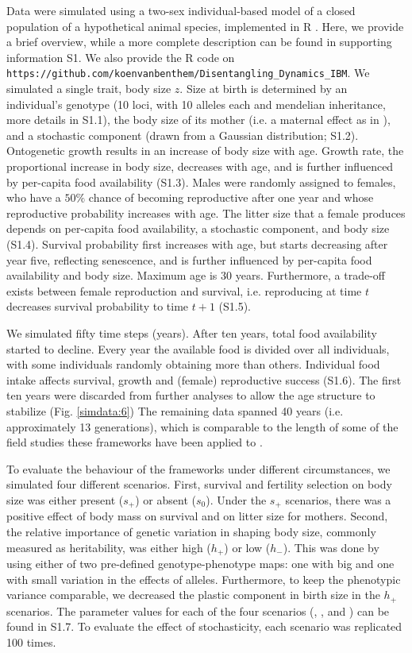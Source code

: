 Data were simulated using a two-sex individual-based model of a closed population of a hypothetical animal species, implemented in R \parencite{R2014}. Here, we provide a brief overview, while a more complete description can be found in supporting information S1. We also provide the R code on \newline \verb|https://github.com/koenvanbenthem/Disentangling_Dynamics_IBM|. We simulated a single trait, body size $z$. Size at birth is determined by an individual's genotype (10 loci, with 10 alleles each and mendelian inheritance, more details in S1.1), the body size of its mother (i.e. a maternal effect as in \cite{Falconer1965}), and a stochastic component (drawn from a Gaussian distribution; S1.2). Ontogenetic growth results in an increase of body size with age. Growth rate, the proportional increase in body size,  decreases with age, and is further influenced by per-capita food availability (S1.3). Males were randomly assigned to females, who have a $50\%$ chance of becoming reproductive after one year and whose reproductive probability increases with age. The litter size that a female produces depends on per-capita food availability, a stochastic component, and body size (S1.4). Survival probability first increases with age, but starts decreasing after year five, reflecting senescence, and is further influenced by per-capita food availability and body size. Maximum age is 30 years. Furthermore, a trade-off exists between female reproduction and survival, i.e. reproducing at time $t$ decreases survival probability to time $t+1$ (S1.5). 

We simulated fifty time steps (years). After ten years, total food availability started to decline. Every year the available food is divided over all individuals, with some individuals randomly obtaining more than others. Individual food intake affects survival, growth and (female) reproductive success (S1.6). The first ten years were discarded from further analyses to allow the age structure to stabilize (Fig. \ref{simdata:6}) The remaining data spanned 40 years (i.e. approximately 13 generations), which is comparable to the length of some of the field studies these frameworks have been applied to \parencite{Clutton-brock2010}. 

To evaluate the behaviour of the frameworks under different circumstances, we simulated four different scenarios. First, survival and fertility selection on body size was either present ($s_+$) or absent ($s_0$). Under the $s_+$ scenarios, there was a positive effect of body mass on survival and on litter size for mothers. Second, the relative importance of genetic variation in shaping body size, commonly measured as heritability, was either high ($h_+$) or low ($h_-$). This was done by using either of two pre-defined genotype-phenotype maps: one with big and one with small variation in the effects of alleles. Furthermore, to keep the phenotypic variance comparable, we decreased the plastic component in birth size in the $h_+$ scenarios. The parameter values for each of the four scenarios (\sh, \sH, \Sh and \SH) can be found in S1.7. To evaluate the effect of stochasticity, each scenario was replicated 100 times.

